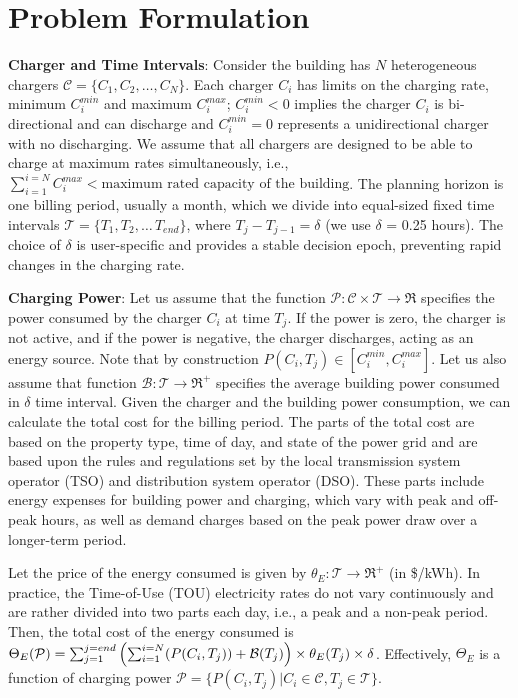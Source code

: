 \section{Problem Formulation}
\label{sec:problem_statement}

%

\noindent \textbf{Charger and Time Intervals}: Consider the building has $N$ heterogeneous chargers $\mathcal{C} = \{C_1, C_2, \dots,C_N\}$. Each charger $C_i$ has limits on the charging rate, minimum $C_i^{min}$ and maximum $C_i^{max}$; $C_i^{min} < 0$ implies the charger $C_i$ is bi-directional and can discharge and $C_i^{min} = 0$ represents a unidirectional charger with no discharging. We assume that all chargers are designed to be able to charge at maximum rates simultaneously, i.e., $\sum_{i=1}^{i=N} C_i^{max} < \text{maximum rated capacity of the building} $.  
The planning horizon is one billing period, usually a month, which we divide into equal-sized fixed time intervals $\mathcal{T} = \{T_1, T_2, \dots\, T_{end}\}$, where $T_{j}-T_{j-1}=\delta$ (we use  $\delta$ = 0.25 hours). The choice of $\delta$ is user-specific and provides a stable decision epoch, preventing rapid changes in the charging rate.

\noindent \textbf{Charging Power}: Let us assume that the function $\mathcal{P}:  \mathcal{C} \times \mathcal{T}  \rightarrow \Re$ specifies the power consumed by the charger $C_i$ at time $T_j$. If the power is zero, the charger is not active, and if the power is negative, the charger discharges, acting as an energy source. Note that by construction $P(C_i,T_j) \in [C_i^{min},C_i^{max}]$. Let us also assume that function $\mathcal{B}: \mathcal{T}  \rightarrow \Re^{+} $ specifies the average building power consumed in $\delta$ time interval. 
Given the charger and the building power consumption, we can calculate the total cost for the billing period. The parts of the total cost are based on the property type, time of day, and state of the power grid and are based upon the rules and regulations set by the local transmission system operator (TSO) and distribution system operator (DSO). These parts include energy expenses for building power and charging, which vary with peak and off-peak hours, as well as demand charges based on the peak power draw over a longer-term period. 

Let the price of the energy consumed is given by $\theta_E : \mathcal{T}  \rightarrow \Re^{+}$ (in \$/kWh). In practice, the Time-of-Use (TOU) electricity rates do not vary continuously and are rather divided into two parts each day, i.e., a peak and a non-peak period. 
Then, the total cost of the energy consumed is  $\Theta_E(\mathcal{P})= \sum_{j=1}^{j=end} \left(\sum_{i=1}^{i=N} (P(C_i,T_j)) + \mathcal{B} (T_j)\right) \times \theta_E  (T_j) \times \delta$. Effectively, $\Theta_E$ is a function of charging power  $\mathcal{P}=\{P(C_i, T_j)| C_i\in \mathcal{C}, T_j\in \mathcal{T}\}$.  
 
